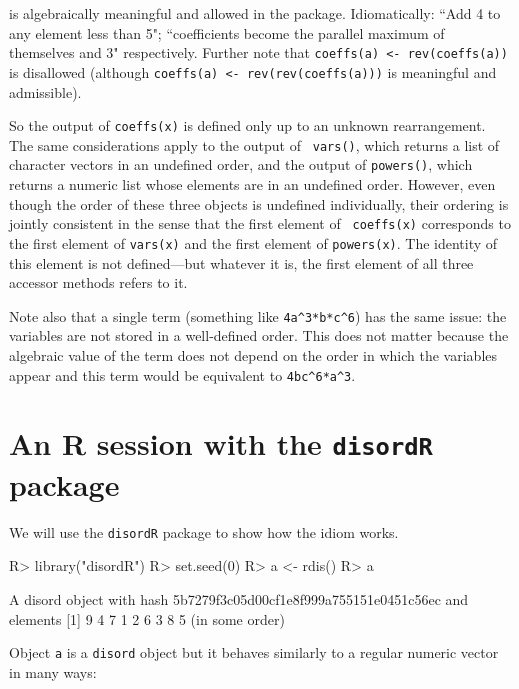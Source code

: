 \documentclass{article}
\begin{document}
is algebraically meaningful and allowed in the package.
Idiomatically: ``Add 4 to any element less than 5"; ``coefficients
become the parallel maximum of themselves and 3" respectively.
Further note that {\tt coeffs(a) <- rev(coeffs(a))} is disallowed
(although {\tt coeffs(a) <- rev(rev(coeffs(a)))} is meaningful and
admissible).

So the output of {\tt coeffs(x)} is defined only up to an unknown
rearrangement.  The same considerations apply to the output of {\tt
vars()}, which returns a list of character vectors in an undefined
order, and the output of {\tt powers()}, which returns a numeric list
whose elements are in an undefined order.  However, even though the
order of these three objects is undefined individually, their ordering
is jointly consistent in the sense that the first element of {\tt
coeffs(x)} corresponds to the first element of {\tt vars(x)} and the
first element of {\tt powers(x)}.  The identity of this element is not
defined---but whatever it is, the first element of all three accessor
methods refers to it.

Note also that a single term (something like \verb+4a^3*b*c^6+) has
the same issue: the variables are not stored in a well-defined order.
This does not matter because the algebraic value of the term does not
depend on the order in which the variables appear and this term would
be equivalent to \verb+4bc^6*a^3+.

\section{An R session with the {\tt disordR} package}

We will use the {\tt disordR} package to show how the idiom works.

\begin{Schunk}
\begin{Sinput}
R> library("disordR")
R> set.seed(0)
R> a <- rdis()
R> a
\end{Sinput}
\begin{Soutput}
A disord object with hash 5b7279f3c05d00cf1e8f999a755151e0451c56ec and elements
[1] 9 4 7 1 2 6 3 8 5
(in some order)
\end{Soutput}
\end{Schunk}

Object {\tt a} is a {\tt disord} object but it behaves similarly to a
regular numeric vector in many ways:
\end{document}
